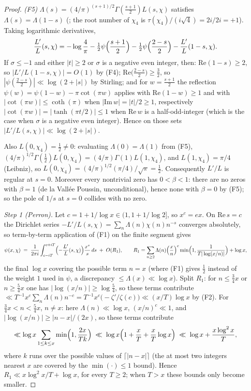 \begin{proof}
\emph{(F5)} $\Lambda(s)=(4/\pi)^{(s+1)/2}\Gamma(\tfrac{s+1}2)L(s,\chi)$
satisfies $\Lambda(s)=\Lambda(1-s)$ (\cite[\S9]{Dav00}; the root number
of $\chi_4$ is $\tau(\chi_4)/(i\sqrt4)=2i/2i=+1$). Taking logarithmic
derivatives,
\[
\frac{L'}{L}(s,\chi)
=-\log\frac4\pi-\tfrac12\psi\Bigl(\frac{s+1}2\Bigr)
-\tfrac12\psi\Bigl(\frac{2-s}2\Bigr)-\frac{L'}{L}(1-s,\chi).
\]
If $\sigma\le-1$ and either $|t|\ge2$ or $\sigma$ is a negative even
integer, then: $\mathrm{Re}(1-s)\ge2$, so $|L'/L(1-s,\chi)|=O(1)$ by
(F4); $\mathrm{Re}\bigl(\frac{2-s}2\bigr)\ge\tfrac32$, so
$|\psi(\frac{2-s}2)|\ll\log(2+|s|)$ by Stirling; and for
$w=\frac{s+1}2$ the reflection $\psi(w)=\psi(1-w)-\pi\cot(\pi w)$
applies with $\mathrm{Re}(1-w)\ge1$ and with $|\cot(\pi w)|\le
\coth(\pi)$ when $|\mathrm{Im}\,w|=|t|/2\ge1$, respectively
$|\cot(\pi w)|=|\tanh(\pi t/2)|\le1$ when $\mathrm{Re}\,w$ is a
half-odd-integer (which is the case when $\sigma$ is a negative even
integer). Hence on those sets
$|L'/L(s,\chi)|\ll\log(2+|s|)$.

Also $L(0,\chi_4)=\tfrac12\ne0$: evaluating $\Lambda(0)=\Lambda(1)$
from (F5),
$(4/\pi)^{1/2}\Gamma(\tfrac12)L(0,\chi_4)=(4/\pi)\Gamma(1)L(1,\chi_4)$,
and $L(1,\chi_4)=\pi/4$ (Leibniz), so
$L(0,\chi_4)=(4/\pi)^{1/2}(\pi/4)/\sqrt{\pi}=\tfrac12$.
Consequently $L'/L$ is regular at $s=0$. Moreover every nontrivial zero
has $0<\beta<1$: there are no zeros with $\beta=1$ (de la Vall\'ee
Poussin, unconditional), hence none with $\beta=0$ by (F5); so the pole
of $1/s$ at $s=0$ collides with no zero.

\emph{Step 1 (Perron).} Let $c=1+1/\log x\in(1,1+1/\log2]$, so
$x^c=ex$. On $\mathrm{Re}\,s=c$ the Dirichlet series
$-L'/L(s,\chi)=\sum_n\Lambda(n)\chi(n)n^{-s}$ converges absolutely, so
term-by-term application of (F1) on the finite segment gives
\[
\psi(x,\chi)\;=\;\frac{1}{2\pi i}\int_{c-iT}^{c+iT}
\Bigl(-\frac{L'}{L}(s,\chi)\Bigr)\frac{x^s}{s}\,ds\;+\;O(R_1),
\qquad
R_1=\sum_{n\ge2}\Lambda(n)\Bigl(\frac xn\Bigr)^{c}
\min\Bigl(1,\frac{1}{T|\log(x/n)|}\Bigr)+\log x,
\]
the final $\log x$ covering the possible term $n=x$ (where (F1) gives
$\tfrac12$ instead of the weight $1$ used in $\psi$, a discrepancy
$\le\Lambda(x)\ll\log x$). Split $R_1$:
for $n\le\tfrac34x$ or $n\ge\tfrac54x$ one has $|\log(x/n)|\ge
\log\tfrac54$, so these terms contribute
$\ll T^{-1}x^{c}\sum_n\Lambda(n)n^{-c}
=T^{-1}x^{c}\bigl(-\zeta'/\zeta(c)\bigr)\ll(x/T)\log x$ by (F2). For
$\tfrac34x<n<\tfrac54x$, $n\ne x$: here $\Lambda(n)\ll\log x$,
$(x/n)^c\ll1$, and $|\log(x/n)|\ge|n-x|/(2x)$, so these terms
contribute
\[
\ll\log x\sum_{1\le k\le x}\min\Bigl(1,\frac{2x}{Tk}\Bigr)
\;\ll\;\log x\Bigl(1+\frac xT+\frac xT\log x\Bigr)
\;\ll\;\log x+\frac{x\log^2x}{T},
\]
where $k$ runs over the possible values of $\lceil|n-x|\rceil$ (the at
most two integers nearest $x$ are covered by the $\min(\cdot)\le1$
bound). Hence $R_1\ll x\log^2x/T+\log x$, for every $T\ge2$; when $T>x$
these bounds only become smaller.


\end{proof}
